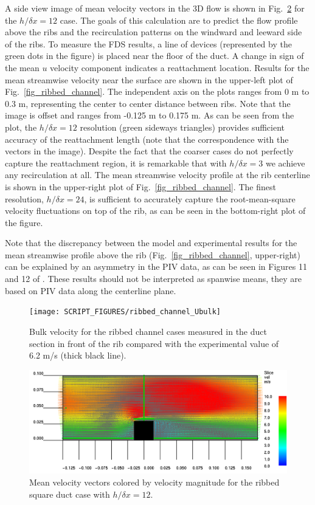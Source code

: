 \documentclass[11pt]{book}
\begin{document}
A side view image of mean velocity vectors in the 3D flow is shown in Fig.~\ref{fig_ribbed_channel_image} for the $h/\delta x = 12$ case.  The goals of this calculation are to predict the flow profile above the ribs and the recirculation patterns on the windward and leeward side of the ribs.  To measure the FDS results, a line of devices (represented by the green dots in the figure) is placed near the floor of the duct.  A change in sign of the mean $u$ velocity component indicates a reattachment location.  Results for the mean streamwise velocity near the surface are shown in the upper-left plot of Fig.~\ref{fig_ribbed_channel}.  The independent axis on the plots ranges from 0 m to 0.3 m, representing the center to center distance between ribs.  Note that the image is offset and ranges from -0.125 m to 0.175 m.  As can be seen from the plot, the $h/\delta x = 12$ resolution (green sideways triangles) provides sufficient accuracy of the reattachment length (note that the correspondence with the vectors in the image).  Despite the fact that the coarser cases do not perfectly capture the reattachment region, it is remarkable that with $h/\delta x = 3$ we achieve any recirculation at all.  The mean streamwise velocity profile at the rib centerline is shown in the upper-right plot of Fig.~\ref{fig_ribbed_channel}. The finest resolution, $h/\delta x=24$, is sufficient to accurately capture the root-mean-square velocity fluctuations on top of the rib, as can be seen in the bottom-right plot of the figure.

Note that the discrepancy between the model and experimental results for the mean streamwise profile above the rib (Fig.~\ref{fig_ribbed_channel}, upper-right) can be explained by an asymmetry in the PIV data, as can be seen in Figures 11 and 12 of \cite{Casara:2}.  These results should not be interpreted as spanwise means, they are based on PIV data along the centerline plane.

\begin{figure}[ht]
\centering
\texttt{[image: SCRIPT\_FIGURES/ribbed\_channel\_Ubulk]}
\caption[Bulk velocity {\ct ribbed\_channel} test case]{Bulk velocity for the ribbed channel cases measured in the duct section in front of the rib compared with the experimental value of 6.2 m/s (thick black line).}
\label{fig_ribbed_channel_Ubulk}
\end{figure}

\begin{figure}[ht]
\centering
\includegraphics[width=.8\textwidth]{FIGURES/ribbed_channel_vel}
\caption[The {\ct ribbed\_channel} test case]{Mean velocity vectors colored by velocity magnitude for the ribbed square duct case with $h/\delta x = 12$.}
\label{fig_ribbed_channel_image}
\end{figure}
\end{document}
